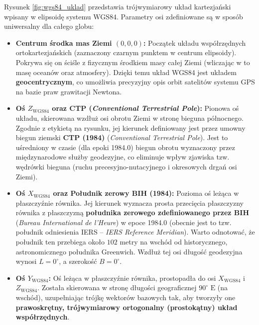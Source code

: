 Rysunek \ref{fig:wgs84_uklad} przedstawia trójwymiarowy układ kartezjański wpisany w elipsoidę systemu WGS84. Parametry osi zdefiniowane są w sposób uniwersalny dla całego globu:
\begin{itemize}
    \item \textbf{Centrum środka mas Ziemi $(0,0,0)$:} 
    Początek układu współrzędnych ortokartezjańskich (zaznaczony czarnym punktem w centrum elipsoidy). Pokrywa się on ściśle z fizycznym środkiem masy całej Ziemi (wliczając w to masę oceanów oraz atmosfery). Dzięki temu układ WGS84 jest układem \textbf{geocentrycznym}, co umożliwia precyzyjny opis orbit satelitów systemu GPS na bazie praw grawitacji Newtona.

    \item \textbf{Oś $Z_{\text{WGS84}}$ oraz CTP (\textit{Conventional Terrestrial Pole}):} 
    Pionowa oś układu, skierowana wzdłuż osi obrotu Ziemi w stronę bieguna północnego. Zgodnie z etykietą na rysunku, jej kierunek definiowany jest przez umowny biegun ziemski \textbf{CTP (1984)} (\textit{Conventional Terrestrial Pole}). Jest to uśredniony w czasie (dla epoki 1984.0) biegun obrotu wyznaczony przez międzynarodowe służby geodezyjne, co eliminuje wpływ zjawiska tzw. wędrówki bieguna (ruchu precesyjno-nutacyjnego i okresowych drgań osi Ziemi).

    \item \textbf{Oś $X_{\text{WGS84}}$ oraz Południk zerowy BIH (1984):} 
    Pozioma oś leżąca w płaszczyźnie równika. Jej kierunek wyznacza prosta przecięcia płaszczyzny równika z płaszczyzną \textbf{południka zerowego zdefiniowanego przez BIH} (\textit{Bureau International de l'Heure}) w epoce 1984.0 (obecnie jest to tzw. południk odniesienia IERS -- \textit{IERS Reference Meridian}). Warto odnotować, że południk ten przebiega około $102$ metry na wschód od historycznego, astronomicznego południka Greenwich. Wzdłuż tej osi długość geodezyjna wynosi $L = 0^\circ$, a szerokość $B = 0^\circ$.

    \item \textbf{Oś $Y_{\text{WGS84}}$:} 
    Oś leżąca w płaszczyźnie równika, prostopadła do osi $X_{\text{WGS84}}$ i $Z_{\text{WGS84}}$. Została skierowana w stronę długości geograficznej $90^\circ\text{ E}$ (na wschód), uzupełniając trójkę wektorów bazowych tak, aby tworzyły one \textbf{prawoskrętny, trójwymiarowy ortogonalny (prostokątny) układ współrzędnych}.


\end{itemize}
